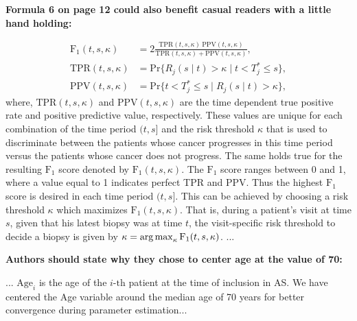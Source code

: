 \begin{enumerate}
    \textbf{Formula 6 on page 12 could also benefit casual readers with a little hand holding:}

    \begin{shadequote}
	\begin{equation}
\label{eq:F1_TPR_PPV}
\begin{split}
\mbox{F}_1(t,  s, \kappa) &= 2\frac{\mbox{TPR}(t,  s, \kappa)\ \mbox{PPV}(t,  s, \kappa)}{\mbox{TPR}(t,  s, \kappa) + \mbox{PPV}(t,  s, \kappa)},\\
\mbox{TPR}(t,  s, \kappa) &= \mbox{Pr}\big\{R_j(s \mid t) > \kappa \mid t < T^*_j \leq s\big\},\\
\mbox{PPV}(t,  s, \kappa) &= \mbox{Pr}\big\{t < T^*_j \leq s \mid R_j(s \mid t) > \kappa \big\},
\end{split}
\end{equation}
where, $\mbox{TPR}(t,  s, \kappa)$ and $\mbox{PPV}(t,  s, \kappa)$ are the time dependent true positive rate and positive predictive value, respectively. These values are unique for each combination of the time period $(t, s]$ and the risk threshold $\kappa$ that is used to discriminate between the patients whose cancer progresses in this time period versus the patients whose cancer does not progress. The same holds true for the resulting $\mbox{F}_1$ score denoted by $\mbox{F}_1(t,  s, \kappa)$. The $\mbox{F}_1$ score ranges between 0 and 1, where a value equal to 1 indicates perfect TPR and PPV. Thus the highest $\mbox{F}_1$ score is desired in each time period $(t, s]$. This can be achieved by choosing a risk threshold $\kappa$ which maximizes $\mbox{F}_1(t, s, \kappa)$. That is, during a patient's visit at time $s$, given that his latest biopsy was at time $t$, the visit-specific risk threshold to decide a biopsy is given by ${\kappa=\operatorname{arg\,max}_{\kappa} \mbox{F}_1(t, s, \kappa)}$. ...
    \end{shadequote}

    \textbf{Authors should state why they chose to center age at the value of 70:}
    \begin{shadequote}
		... $\mbox{Age}_i$ is the age of the ${i\mbox{-th}}$ patient at the time of inclusion in AS. We have centered the Age variable around the median age of 70 years for better convergence during parameter estimation...
	\end{shadequote}
\end{enumerate}